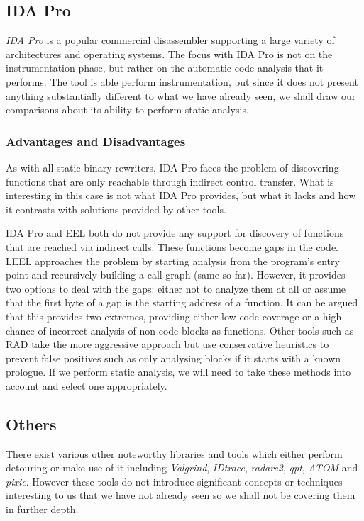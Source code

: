 \subsection{IDA Pro}

\emph{IDA Pro} is a popular commercial disassembler supporting a large variety of architectures and operating systems\cite{ida,stripped_binary}. The focus with IDA Pro is not on the instrumentation phase, but rather on the automatic code analysis that it performs. The tool is able perform instrumentation, but since it does not present anything substantially different to what we have already seen, we shall draw our comparisons about its ability to perform static analysis.

\subsubsection{Advantages and Disadvantages}

As with all static binary rewriters, IDA Pro faces the problem of discovering functions that are only reachable through indirect control transfer. What is interesting in this case is not what IDA Pro provides, but what it lacks and how it contrasts with solutions provided by other tools.

IDA Pro and EEL both do not provide any support for discovery of functions that are reached via indirect calls. These functions become gaps in the code. LEEL approaches the problem by starting analysis from the program's entry point and recursively building a call graph (same so far). However, it provides two options to deal with the gaps\cite{leel}: either not to analyze them at all or assume that the first byte of a gap is the starting address of a function. It can be argued that this provides two extremes, providing either low code coverage or a high chance of incorrect analysis of non-code blocks as functions. Other tools such as RAD\cite{rad} take the more aggressive approach but use conservative heuristics to prevent false positives such as only analysing blocks if it starts with a known prologue. If we perform static analysis, we will need to take these methods into account and select one appropriately.

\subsection{Others}

There exist various other noteworthy libraries and tools which either perform detouring or make use of it including \emph{Valgrind}, \emph{IDtrace}, \emph{radare2}, \emph{qpt}, \emph{ATOM} and \emph{pixie}\cite{valgrind,IDtrace,radare2,qpt,atom,qpt_pixie}. However these tools do not introduce significant concepts or techniques interesting to us that we have not already seen so we shall not be covering them in further depth.